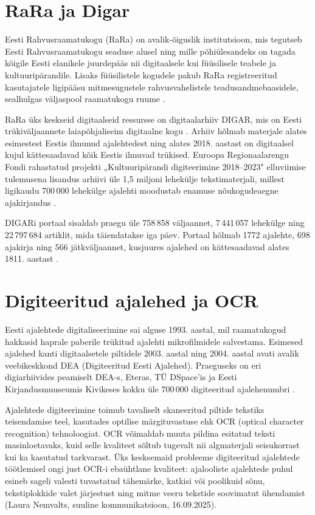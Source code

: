 \section{RaRa ja Digar}\label{sec:first-section}
Eesti Rahvusraamatukogu (RaRa) on avalik-õiguslik institutsioon, mis tegutseb Eesti Rahvusraamatukogu seaduse alusel ning mille põhiülesandeks on tagada kõigile Eesti elanikele juurdepääs nii digitaalsele kui füüsilisele teabele ja kultuuripärandile. Lisaks füüsilistele kogudele pakub RaRa registreeritud kasutajatele ligipääsu mitmesugustele rahvusvahelistele teadusandmebaasidele, sealhulgas väljaspool raamatukogu ruume \cite{rara}.

RaRa üks keskseid digitaalseid ressursse on digitaalarhiiv DIGAR, mis on Eesti trükiväljaannete laiapõhjaliseim digitaalne kogu \cite{rara}. Arhiiv hõlmab materjale alates esimestest Eestis ilmunud ajalehtedest ning alates 2018. aastast on digitaalsel kujul kättesaadavad kõik Eestis ilmuvad trükised. Euroopa Regionaalarengu Fondi rahastatud projekti „Kultuuripärandi digiteerimine 2018--2023" elluviimise tulemusena lisandus arhiivi üle 1,5 miljoni lehekülje tekstimaterjali, millest ligikaudu 700\,000 lehekülge ajalehti moodustab enamuse nõukogudeaegne ajakirjandus \cite{digar}.

DIGARi portaal sisaldab praegu üle 758\,858 väljaannet, 7\,441\,057 lehekülge ning 22\,797\,684 artiklit, mida täiendatakse iga päev. Portaal hõlmab 1772 ajalehte, 698 ajakirja ning 566 jätkväljaannet, kusjuures ajalehed on kättesaadavad alates 1811. aastast \cite{digar}.

\section{Digiteeritud ajalehed ja OCR}\label{sec:second-section}
Eesti ajalehtede digitaliseerimine sai alguse 1993. aastal, mil raamatukogud hakkasid haprale paberile trükitud ajalehti mikrofilmidele salvestama. Esimesed ajalehed kanti digitaalsetele piltidele 2003. aastal ning 2004. aastal avati avalik veebikeskkond DEA (Digiteeritud Eesti Ajalehed). Praeguseks on eri digiarhiivides peamiselt DEA-s, Eteras, TÜ DSpace'is ja Eesti Kirjandusmuuseumis Kivikeses kokku üle 700\,000 digiteeritud ajalehenumbri \cite[lk~75--80]{tinits2025}.

Ajalehtede digiteerimine toimub tavaliselt skaneeritud piltide tekstiks teisendamise teel, kasutades optilise märgituvastuse ehk OCR (optical character recognition) tehnoloogiat. OCR võimaldab muuta pildina esitatud teksti masinloetavaks, kuid selle kvaliteet sõltub tugevalt nii algmaterjali seisukorrast kui ka kasutatud tarkvarast. Üks kesksemaid probleeme digiteeritud ajalehtede töötlemisel ongi just OCR-i ebaühtlane kvaliteet: ajalooliste ajalehtede puhul esineb sageli valesti tuvastatud tähemärke, katkisi või poolikuid sõnu, tekstiplokkide valet järjestust ning mitme veeru tekstide soovimatut ühendamist (Laura Nemvalts, suuline kommunikatsioon, 16.09.2025).

